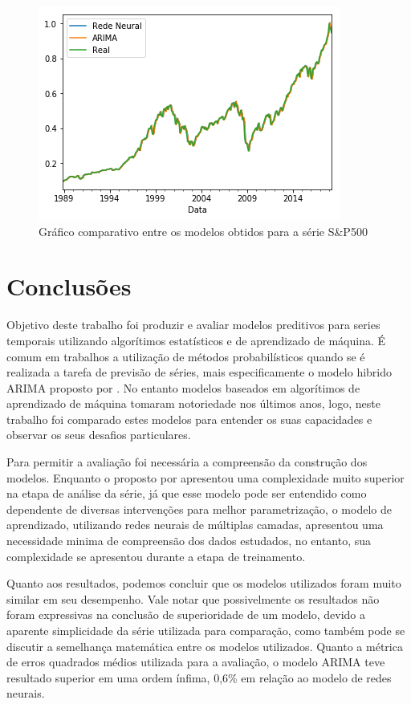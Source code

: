\documentclass[
    12pt,
    oneside,
    a4paper,
    english,
    brazil
]{abntex2}
\begin{document}
\begin{figure}[ht]
    \centering
    \caption{Gráfico comparativo entre os modelos obtidos para a série
    S\&P500}\label{fig:comparesp500}
    \includegraphics[width=.5\linewidth]{images/sp500_prediction_compare.png}
\end{figure}

\chapter{Conclusões}\label{chap:concl}

Objetivo deste trabalho  foi produzir e avaliar modelos  preditivos para series
temporais utilizando  algorítimos estatísticos e  de aprendizado de  máquina. É
comum  em  trabalhos  a  utilização  de métodos  probabilísticos  quando  se  é
realizada a tarefa de previsão de séries, mais especificamente o modelo hibrido
ARIMA proposto por . No entanto modelos baseados em algorítimos
de aprendizado  de máquina  tomaram notoriedade nos  últimos anos,  logo, neste
trabalho  foi comparado  estes  modelos  para entender  os  suas capacidades  e
observar os seus desafios particulares.

Para  permitir a  avaliação  foi  necessária a  compreensão  da construção  dos
modelos. Enquanto  o proposto por   apresentou uma complexidade
muito  superior na  etapa de  análise da  série, já  que esse  modelo pode  ser
entendido como dependente de  diversas intervenções para melhor parametrização,
o  modelo  de  aprendizado,  utilizando redes  neurais  de  múltiplas  camadas,
apresentou  uma  necessidade minima  de  compreensão  dos dados  estudados,  no
entanto, sua complexidade se apresentou durante a etapa de treinamento.

Quanto aos resultados,  podemos concluir que os modelos  utilizados foram muito
similar em seu desempenho. Vale notar que possivelmente os resultados não foram
expressivas  na conclusão  de superioridade  de  um modelo,  devido a  aparente
simplicidade da série utilizada para comparação, como também pode se discutir a
semelhança matemática  entre os modelos  utilizados. Quanto a métrica  de erros
quadrados  médios utilizada  para a  avaliação, o  modelo ARIMA  teve resultado
superior em uma ordem ínfima, 0,6\% em relação ao modelo de redes neurais.
\end{document}
